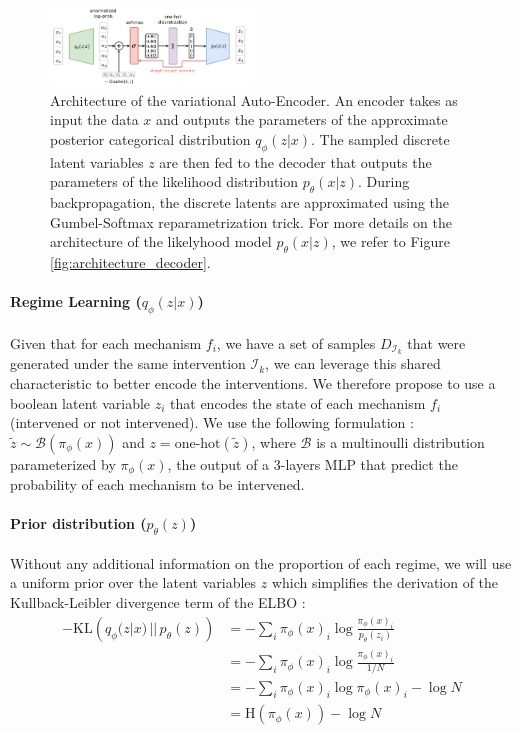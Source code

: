 \documentclass{article}
\begin{document}
\begin{figure}
    \centering
    \includegraphics[width=0.48\textwidth]{images/architecture.pdf}
    \caption{Architecture of the variational Auto-Encoder. An encoder takes as input the data $x$ and outputs the parameters of the approximate posterior categorical distribution $q_\phi(z | x)$. The sampled discrete latent variables $z$ are then fed to the decoder that outputs the parameters of the likelihood distribution $p_\theta(x | z)$. During backpropagation, the discrete latents are approximated using the Gumbel-Softmax reparametrization trick. For more details on the architecture of the likelyhood model $p_\theta(x | z)$, we refer to Figure \ref{fig:architecture_decoder}.}
    \label{fig:architecture}
\end{figure}
\paragraph{Regime Learning ($q_\phi(z | x)$)}Given that for each mechanism $f_i$, we have a set of samples
$D_{\mathcal{I}_k}$ that were generated under the same intervention
$\mathcal{I}_k$, we can leverage this shared characteristic to better encode
the interventions. We therefore propose to use a boolean latent variable $z_i$
that encodes the state of each mechanism $f_i$ (intervened or not intervened).
We use the following formulation : $\tilde{z} \sim \mathcal{B}(\pi_\phi(x))$
and $z = \text{one-hot}(\tilde{z})$, where $\mathcal{B}$ is a multinoulli
distribution parameterized by $\pi_\phi(x)$, the output of a 3-layers MLP that
predict the probability of each mechanism to be intervened.
\paragraph{Prior distribution ($p_\theta(z)$)} Without any additional information on the proportion of each regime, we will
use a uniform prior over the latent variables $z$ which simplifies the
derivation of the Kullback-Leibler divergence term of the ELBO :
\begin{align*}
    -\text{KL}\left(q_\phi(z | x) \,||\, p_\theta(z)\right)
     & = - \sum_{i} \pi_\phi(x)_i \log \frac{\pi_\phi(x)_i}{p_\theta(z_i)} \\
     & = - \sum_{i} \pi_\phi(x)_i \log \frac{\pi_\phi(x)_i}{1/N}           \\
     & = - \sum_{i} \pi_\phi(x)_i \log \pi_\phi(x)_i - \log N              \\
     & = \text{H}(\pi_\phi(x)) - \log N
\end{align*}
\end{document}
